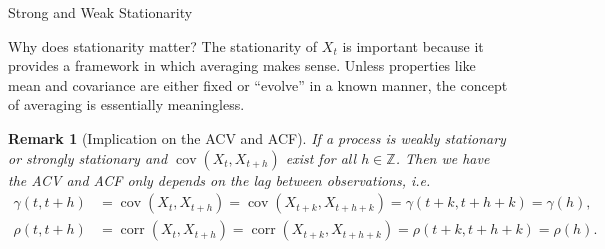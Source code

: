 \documentclass[envcountsect,usenames,dvipsnames]{beamer}
\DeclareMathOperator*{\cov}{cov}
\DeclareMathOperator*{\corr}{corr}
\theoremstyle{mystyle}
\newtheorem{Remark}{Remark}
\begin{document}

\begin{frame}{Strong and Weak Stationarity}
	\small
    \begin{block}{Why does stationarity matter?}
    The stationarity of ${X_{t}}$ is important because it provides a framework in which averaging makes sense. Unless properties like mean and covariance are either {fixed} or ``evolve'' in a known manner, the concept of averaging is essentially meaningless.
    \end{block}
    
    \begin{Remark}[Implication on the ACV and ACF]
    \label{rem:ACF:stab}
    If a process is weakly stationary or strongly stationary and $\cov(X_{t},X_{t+h})$ exist for all $h \in \mathbb{Z}$. Then we have the ACV and ACF only depends on the lag between observations, i.e.
    \begin{equation*}
        \begin{aligned}
            \gamma(t, t+h) &= \cov(X_{t},X_{t+h})= \cov(X_{t + k},X_{t+h + k}) = \gamma(t+k, t+h+k) = \gamma(h),\\
            \rho(t, t+h) &= \corr(X_{t},X_{t+h})= \corr(X_{t + k},X_{t+h + k}) = \rho(t+k, t+h+k) = \rho(h).
        \end{aligned}
    \end{equation*}
    \end{Remark}
\end{frame}
  
\end{document}
